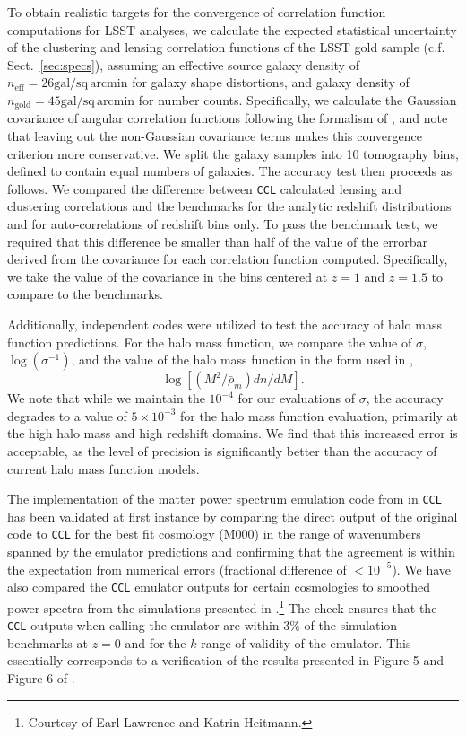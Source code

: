 \documentclass[\docopts]{\docclass}
\newcommand{\ccl}{{\tt CCL}\xspace}
\begin{document}
To obtain realistic targets for the convergence of correlation function computations for LSST analyses, we calculate the expected statistical uncertainty of the clustering and lensing correlation functions of the LSST gold sample (c.f. Sect.~\ref{sec:specs}), assuming an effective source galaxy density of $n_\mathrm{eff} = 26\mathrm{gal/sq\,arcmin}$ for galaxy shape distortions, and galaxy density of $n_\mathrm{gold} = 45\mathrm{gal/sq\,arcmin}$ for number counts. Specifically, we calculate the Gaussian covariance of angular correlation functions following the formalism of \citet{2008A&A...477...43J}, and note that leaving out the non-Gaussian covariance terms makes this convergence criterion more conservative. We split the galaxy samples into 10 tomography bins, defined to contain equal numbers of galaxies. The accuracy test then proceeds as follows. We compared the difference between \ccl calculated lensing and clustering correlations and the benchmarks for the analytic redshift distributions and for auto-correlations of redshift bins only. To pass the benchmark test, we required that this difference be smaller than half of the value of the errorbar derived from the covariance for each correlation function computed. Specifically, we take the value of the covariance in the bins centered at $z=1$ and $z=1.5$ to compare to the benchmarks.

Additionally, independent codes were utilized to test the accuracy of halo mass function predictions. For the halo mass function, we compare the value of $\sigma$, $\log(\sigma^{-1})$, and the value of the halo mass function in the form used in \cite{Tinker2008},
\begin{equation}
\log[(M^2/\bar{\rho}_m)dn/dM].
\end{equation}
We note that while we maintain the $10^{-4}$ for our evaluations of $\sigma$, the accuracy degrades to a value of $5\times10^{-3}$ for the halo mass function evaluation, primarily at the high halo mass and high redshift domains. We find that this increased error is acceptable, as the level of precision is significantly better than the accuracy of current halo mass function models.

The implementation of the matter power spectrum emulation code from \citet{Lawrence17} in \ccl has been validated at first instance by comparing the direct output of the original code to \ccl for the best fit cosmology (M000) in the range of wavenumbers spanned by the emulator predictions and confirming that the agreement is within the expectation from numerical errors (fractional difference of $<10^{-5}$). We have also compared the \ccl emulator outputs for certain cosmologies to smoothed power spectra from the simulations presented in \citet{Lawrence17}.\footnote{Courtesy of Earl Lawrence and Katrin Heitmann.} The check ensures that the \ccl outputs when calling the emulator are within $3\%$ of the simulation benchmarks at $z=0$ and for the $k$ range of validity of the emulator. This essentially corresponds to a verification of the results presented in Figure 5 and Figure 6 of \citet{Lawrence17}.
\end{document}

